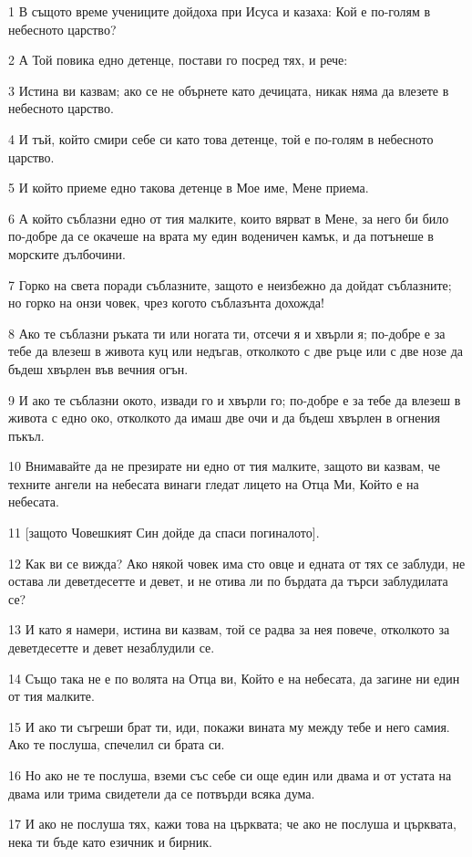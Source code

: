 \par 1 В същото време учениците дойдоха при Исуса и казаха: Кой е по-голям в небесното царство?
\par 2 А Той повика едно детенце, постави го посред тях, и рече:
\par 3 Истина ви казвам; ако се не обърнете като дечицата, никак няма да влезете в небесното царство.
\par 4 И тъй, който смири себе си като това детенце, той е по-голям в небесното царство.
\par 5 И който приеме едно такова детенце в Мое име, Мене приема.
\par 6 А който съблазни едно от тия малките, които вярват в Мене, за него би било по-добре да се окачеше на врата му един воденичен камък, и да потънеше в морските дълбочини.
\par 7 Горко на света поради съблазните, защото е неизбежно да дойдат съблазните; но горко на онзи човек, чрез когото съблазънта дохожда!
\par 8 Ако те съблазни ръката ти или ногата ти, отсечи я и хвърли я; по-добре е за тебе да влезеш в живота куц или недъгав, отколкото с две ръце или с две нозе да бъдеш хвърлен във вечния огън.
\par 9 И ако те съблазни окото, извади го и хвърли го; по-добре е за тебе да влезеш в живота с едно око, отколкото да имаш две очи и да бъдеш хвърлен в огнения пъкъл.
\par 10 Внимавайте да не презирате ни едно от тия малките, защото ви казвам, че техните ангели на небесата винаги гледат лицето на Отца Ми, Който е на небесата.
\par 11 [защото Човешкият Син дойде да спаси погиналото].
\par 12 Как ви се вижда? Ако някой човек има сто овце и едната от тях се заблуди, не остава ли деветдесетте и девет, и не отива ли по бърдата да търси заблудилата се?
\par 13 И като я намери, истина ви казвам, той се радва за нея повече, отколкото за деветдесетте и девет незаблудили се.
\par 14 Също така не е по волята на Отца ви, Който е на небесата, да загине ни един от тия малките.
\par 15 И ако ти съгреши брат ти, иди, покажи вината му между тебе и него самия. Ако те послуша, спечелил си брата си.
\par 16 Но ако не те послуша, вземи със себе си още един или двама и от устата на двама или трима свидетели да се потвърди всяка дума.
\par 17 И ако не послуша тях, кажи това на църквата; че ако не послуша и църквата, нека ти бъде като езичник и бирник.
